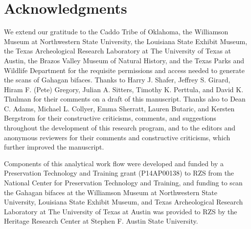 \documentclass[review]{elsarticle}
\begin{document}
\section*{Acknowledgments}

We extend our gratitude to the Caddo Tribe of Oklahoma, the Williamson Museum at Northwestern State University, the Louisiana State Exhibit Museum, the Texas Archeological Research Laboratory at The University of Texas at Austin, the Brazos Valley Museum of Natural History, and the Texas Parks and Wildlife Department for the requisite permissions and access needed to generate the scans of Gahagan bifaces. Thanks to Harry J. Shafer, Jeffrey S. Girard, Hiram F. (Pete) Gregory, Julian A. Sitters, Timothy K. Perttula, and David K. Thulman for their comments on a draft of this manuscript. Thanks also to Dean C. Adams, Michael L. Collyer, Emma Sherratt, Lauren Butaric, and Kersten Bergstrom for their constructive criticisms, comments, and suggestions throughout the development of this research program, and to the editors and anonymous reviewers for their comments and constructive criticisms, which further improved the manuscript.

Components of this analytical work flow were developed and funded by a Preservation Technology and Training grant (P14AP00138) to RZS from the National Center for Preservation Technology and Training, and funding to scan the Gahagan bifaces at the Williamson Museum at Northwestern State University, Louisiana State Exhibit Museum, and Texas Archeological Research Laboratory at The University of Texas at Austin was provided to RZS by the Heritage Research Center at Stephen F. Austin State University.


\end{document}
